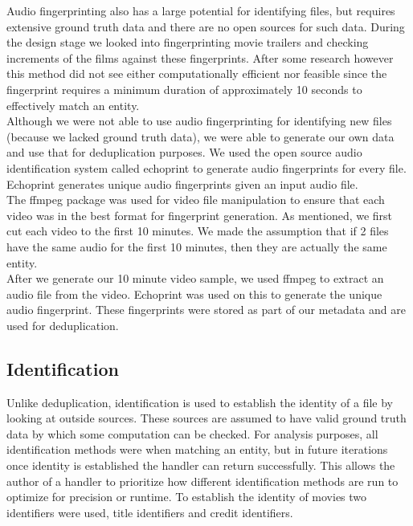 \documentclass[paper=a4, fontsize=11pt]{scrartcl} %
\numberwithin{equation}{section} %
\numberwithin{figure}{section} %
\numberwithin{table}{section} %
\begin{document}
Audio fingerprinting also has a large potential for identifying files, but requires extensive ground truth data and there are no open sources for such data. During the design stage we looked into fingerprinting movie trailers and checking increments of the films against these fingerprints. After some research however this method did not see either computationally efficient nor feasible since the fingerprint requires a minimum duration of approximately 10 seconds to effectively match an entity. \\


Although we were not able to use audio fingerprinting for identifying new files (because we lacked ground truth data), we were able to generate our own data and use that for deduplication purposes. We used the open source audio identification system called echoprint to generate audio fingerprints for every file. Echoprint generates unique audio fingerprints given an input audio file.  \\

The ffmpeg package was used for video file manipulation to ensure that each video was in the best format for fingerprint generation. As mentioned, we first cut each video to the first 10 minutes. We made the assumption that if 2 files have the same audio for the first 10 minutes, then they are actually the same entity. \\

After we generate our 10 minute video sample, we used ffmpeg to extract an audio file from the video. Echoprint was used on this to generate the unique audio fingerprint. These fingerprints were stored as part of our metadata and are used for deduplication.  \\



\subsection{Identification}
\label{sec:identification}
Unlike deduplication, identification is used to establish the identity of a file by looking at outside sources. These sources are assumed to have valid ground truth data by which some computation can be checked. For analysis purposes, all identification methods were when matching an entity, but in future iterations once identity is established the handler can return successfully. This allows the author of a handler to prioritize how different identification methods are run to optimize for precision or runtime. To establish the identity of movies two identifiers were used, title identifiers and credit identifiers. \\
\end{document}
